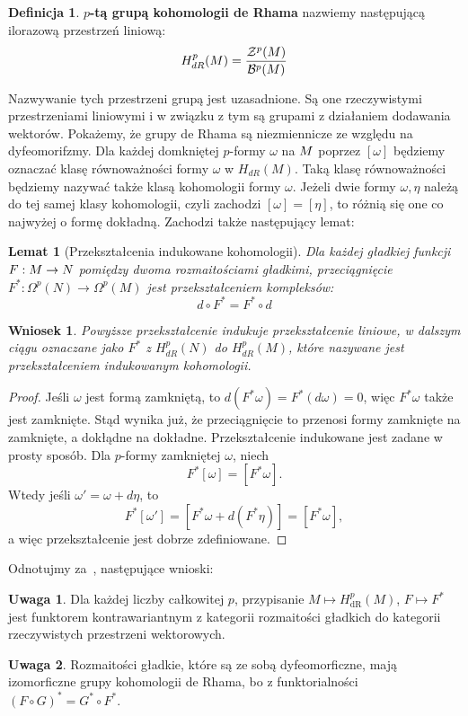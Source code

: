 \documentclass[licencjacka]{pracamgr}
\theoremstyle{definition}
\newtheorem{definition}{Definicja}[section]
\theoremstyle{definition}
\newtheorem{remark}{Uwaga}[section]
\theoremstyle{plain}
\newtheorem{lemma}{Lemat}[section]
\theoremstyle{plain}
\theoremstyle{plain}
\theoremstyle{plain}
\theoremstyle{plain}
\newtheorem{wniosek}{Wniosek}[section]
\def\M{\ensuremath M}
\begin{document}
\begin{definition}
  \textbf{$p$-tą grupą kohomologii de Rhama} nazwiemy następującą
  ilorazową przestrzeń liniową:
  \[
  H^{p}_{dR} ( \M ) = \frac {\mathcal{Z}^p ( \M )} {\mathcal{B}^p ( \M )}
  \]
\end{definition}
Nazwywanie tych przestrzeni grupą jest uzasadnione.  Są one rzeczywistymi
przestrzeniami liniowymi i w związku z tym są grupami z działaniem dodawania
wektorów. Pokażemy, że grupy de Rhama są niezmiennicze ze względu na
dyfeomorifzmy. Dla każdej domkniętej $p$-formy $\omega$ na $\M$ poprzez
$[\omega]$ będziemy oznaczać klasę równoważności formy $\omega$ w $H_{dR} (M)$.
Taką klasę równoważności będziemy nazywać także klasą kohomologii formy
$\omega$. Jeżeli dwie formy $\omega, \eta$ należą do tej samej klasy
kohomologii, czyli zachodzi $[\omega] = [\eta]$, to różnią się one co najwyżej
o formę dokładną. Zachodzi także następujący lemat:

\begin{lemma}[Przekształcenia indukowane kohomologii]
  Dla każdej gładkiej funkcji {$F: \M \rightarrow N$} pomiędzy dwoma
  rozmaitościami gładkimi, przeciągnięcie $F^\ast: \Omega^p(N) \rightarrow
  \Omega^p (M)$  jest przekształceniem kompleksów:
  \[
    d \circ F^\ast = F^\ast \circ d
  \]
\end{lemma}
\begin{wniosek}
  Powyższe przekształcenie indukuje przekształcenie liniowe, w dalszym
  ciągu oznaczane jako $F^\ast$ z $H^p_{dR} (N)$ do $H^p_{dR} (M)$, które
  nazywane jest przekształceniem indukowanym kohomologii. \\
\end{wniosek}
\begin{proof}
  Jeśli $\omega$ jest formą zamkniętą, to $d(F^\ast \omega) = F^\ast(d \omega) = 0$,
  więc $F^\ast \omega$ także jest zamknięte. Stąd wynika już, że przeciągnięcie
  to przenosi formy zamknięte na zamknięte, a dokłądne na dokładne. Przekształcenie
  indukowane jest zadane w prosty sposób. Dla $p$-formy zamkniętej $\omega$, niech
  \[
  F^\ast[\omega] = [F^\ast\omega].
  \]
  Wtedy jeśli $\omega' = \omega + d \eta$, to 
  \[
  F^\ast[\omega'] = [F^\ast\omega + d(F^\ast\eta)] = [F^\ast\omega],
  \]
  a więc przekształcenie jest dobrze zdefiniowane.
\end{proof} 
Odnotujmy za~\cite[Corollary 17.3-4]{lee}, następujące wnioski:
\begin{remark}
Dla każdej liczby całkowitej $p$, przypisanie $M \mapsto H_{\text{dR}}^p(M)$,
$F \mapsto F^\ast$ jest funktorem kontrawariantnym z kategorii
rozmaitości gładkich do kategorii rzeczywistych przestrzeni wektorowych.
\end{remark}
\begin{remark}
  Rozmaitości gładkie, które są ze sobą dyfeomorficzne, mają izomorficzne grupy
  kohomologii de Rhama, bo z funktorialności
  $(F \circ G)^\ast = G^\ast \circ F^\ast$.
\end{remark}
\end{document}
